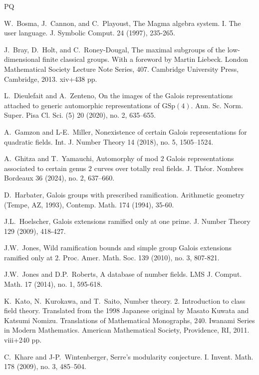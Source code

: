 \documentclass{amsart}
\theoremstyle{definition}
\newcommand{\GSp}{\mathrm{GSp}}
\begin{document}
\begin{thebibliography}{PQ}

  W.~Bosma, J.~Cannon, and C.~Playoust, The Magma algebra system. I. The user language. J. Symbolic Comput. 24 (1997), 235-265.

  J.~Bray, D.~Holt, and C.~Roney-Dougal, The maximal subgroups of the low-dimensional finite classical groups. With a foreword by Martin Liebeck. London Mathematical Society Lecture Note Series, 407. Cambridge University Press, Cambridge, 2013. xiv+438 pp.

  L.~Dieulefait and A.~Zenteno, On the images of the Galois representations attached to generic automorphic representations of $\GSp(4)$. Ann. Sc. Norm. Super. Pisa Cl. Sci. (5) 20 (2020), no. 2, 635–655.

  A.~Gamzon and L-E.~Miller,
  Nonexistence of certain Galois representations for quadratic fields.
  Int. J. Number Theory 14 (2018), no. 5, 1505–1524.

  A.~Ghitza and T.~Yamauchi, Automorphy of mod $2$ Galois representations associated to certain genus $2$ curves over totally real fields. J. Th\'eor. Nombres Bordeaux 36 (2024), no. 2, 637–660.

  D.~Harbater, Galois groups with prescribed ramification. Arithmetic geometry (Tempe, AZ, 1993), Contemp. Math. 174 (1994), 35-60.

  J.L.~Hoelscher, Galois extensions ramified only at one prime. J. Number Theory 129 (2009), 418-427.

  J.W.~Jones, Wild ramification bounds and simple group Galois extensions ramified only at $2$. Proc. Amer. Math. Soc. 139 (2010), no. 3, 807-821.

  J.W.~Jones and D.P.~Roberts, A database of number fields. LMS J. Comput. Math. 17 (2014), no. 1, 595-618.

  K.~Kato, N.~Kurokawa, and T.~Saito, Number theory. 2. Introduction to class field theory. Translated from the 1998 Japanese original by Masato Kuwata and Katsumi Nomizu. Translations of Mathematical Monographs, 240. Iwanami Series in Modern Mathematics. American Mathematical Society, Providence, RI, 2011. viii+240 pp.

  C.~Khare and J-P.~Wintenberger, Serre's modularity conjecture. I. Invent. Math. 178 (2009), no. 3, 485–504.


\end{thebibliography}
\end{document}
